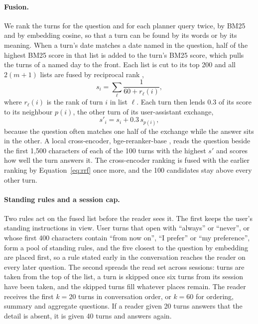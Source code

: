 \paragraph{Fusion.} We rank the turns for the question and for each planner query twice, by BM25 and by embedding cosine, so that a turn can be found by its words or by its meaning. When a turn's date matches a date named in the question, half of the highest BM25 score in that list is added to the turn's BM25 score, which pulls the turns of a named day to the front. Each list is cut to its top 200 and all $2(m+1)$ lists are fused by reciprocal rank \citep{cormack2009rrf},
\begin{equation}
s_i = \sum_{\ell} \frac{1}{60 + r_\ell(i)} ,
\label{eq:rrf}
\end{equation}
where $r_\ell(i)$ is the rank of turn $i$ in list $\ell$. Each turn then lends 0.3 of its score to its neighbour $p(i)$, the other turn of its user-assistant exchange,
\begin{equation}
s'_i = s_i + 0.3\, s_{p(i)} ,
\label{eq:pair}
\end{equation}
because the question often matches one half of the exchange while the answer sits in the other. A local cross-encoder, bge-reranker-base \citep{chen2024bgem3}, reads the question beside the first 1,500 characters of each of the 100 turns with the highest $s'$ and scores how well the turn answers it. The cross-encoder ranking is fused with the earlier ranking by Equation~\ref{eq:rrf} once more, and the 100 candidates stay above every other turn.

\paragraph{Standing rules and a session cap.} Two rules act on the fused list before the reader sees it. The first keeps the user's standing instructions in view. User turns that open with ``always'' or ``never'', or whose first 400 characters contain ``from now on'', ``I prefer'' or ``my preference'', form a pool of standing rules, and the five closest to the question by embedding are placed first, so a rule stated early in the conversation reaches the reader on every later question. The second spreads the read set across sessions: turns are taken from the top of the list, a turn is skipped once six turns from its session have been taken, and the skipped turns fill whatever places remain. The reader receives the first $k = 20$ turns in conversation order, or $k = 60$ for ordering, summary and aggregate questions. If a reader given 20 turns answers that the detail is absent, it is given 40 turns and answers again.

